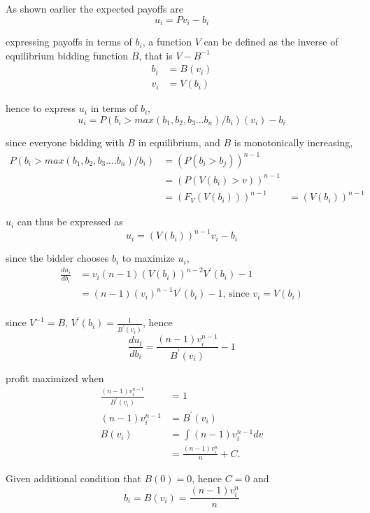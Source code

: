 \documentclass[10pt, a4paper]{article}
\begin{document}
As shown earlier the expected payoffs are 
\[
   u_i = Pv_i - b_i
\]

expressing payoffs in terms of $b_i$, a function $V$ can be defined as the inverse of equilibrium bidding function $B$, that is $V - B^{-1}$
\begin{align*} 
   b_i &= B(v_i)  \\
   v_i &= V(b_i) 
\end{align*}

hence to express $u_i$ in terms of $b_i$, 
\[
   u_i = P(b_i > max(b_1, b_2, b_3 ... b_n) /b_i )(v_i) - b_i 
\]

since everyone bidding with $B$ in equilibrium, and $B$ is monotonically increasing,
\begin{align*}
   P(b_i > max(b_1, b_2, b_3 .... b_n) / b_i ) &= \left(P(b_i > b_j)\right)^{n-1}  \\
                                               &= \left( P(V(b_i) > v)\right)^{n-1} \\
                                               &= \left(F_V(V(b_i))\right) ^{n-1}
                                               &= \left(V(b_i)\right)^{n-1}
\end{align*}

$u_i$ can thus be expressed as 
\[
   u_i = \left(V(b_i)\right)^{n-1}v_i - b_i 
\]

since the bidder chooses $b_i$ to maximize $u_i$, 
\begin{align*}
   \frac{du_i}{db_i} &= v_i(n-1)\left(V(b_i)\right)^{n-2}V^{'}(b_i) - 1 \\
                     &= (n-1)(v_i)^{n-1}V^{'}(b_i) - 1 \text{, since $v_i = V(b_i)$} \\
\end{align*}

since $V^{-1} = B$, $V^{'}(b_i) = \frac{1}{B^{'}(v_i)}$, hence 
\[
   \frac{du_i}{db_i} = \frac{(n-1)v_i^{n-1}}{B^{'}(v_i)} - 1
\]

profit maximized when 
\begin{align*}
   \frac{(n-1)v_i^{n-1}}{B^{'}(v_i)} &= 1 \\
   (n-1)v_i^{n-1} &= B^{'}(v_i) \\
   B(v_i) &= \int (n-1)v_i^{n-1} dv \\
          &= \frac{(n-1)v^n_i}{n}  + C. 
\end{align*}

Given additional condition that $B(0) = 0$, hence $C = 0$ and 
\[
  b_i = B(v_i) = \frac{(n-1)v^n_i}{n} 
\]
\end{document}
